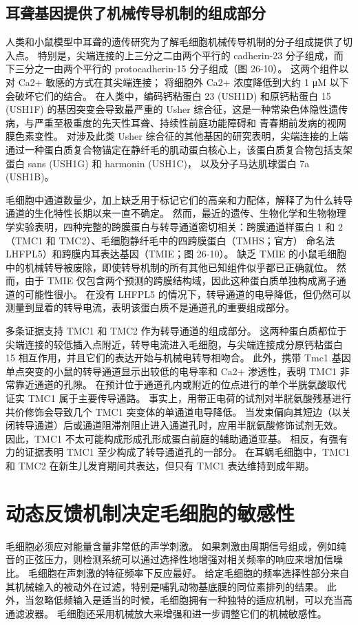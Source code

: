 \subsection{耳聋基因提供了机械传导机制的组成部分}
人类和小鼠模型中耳聋的遗传研究为了解毛细胞机械传导机制的分子组成提供了切入点。 
特别是，尖端连接的上三分之二由两个平行的 cadherin-23 分子组成，而下三分之一由两个平行的 protocadherin-15 分子组成（图 26-10）。 
这两个组件以对 Ca2+ 敏感的方式在其尖端连接； 将细胞外 Ca2+ 浓度降低到大约 1 μM 以下会破坏它们的结合。 
在人类中，编码钙粘蛋白 23 (USH1D) 和原钙粘蛋白 15 (USH1F) 的基因突变会导致最严重的 Usher 综合征，这是一种常染色体隐性遗传病，与严重至极重度的先天性耳聋、持续性前庭功能障碍和 青春期前发病的视网膜色素变性。 
对涉及此类 Usher 综合征的其他基因的研究表明，尖端连接的上端通过一种蛋白质复合物锚定在静纤毛的肌动蛋白核心上，该蛋白质复合物包括支架蛋白 sans (USH1G) 和 harmonin (USH1C)， 以及分子马达肌球蛋白 7a (USH1B)。


毛细胞中通道数量少，加上缺乏用于标记它们的高亲和力配体，解释了为什么转导通道的生化特性长期以来一直不确定。 
然而，最近的遗传、生物化学和生物物理学实验表明，四种完整的跨膜蛋白与转导通道密切相关：跨膜通道样蛋白 1 和 2（TMC1 和 TMC2）、毛细胞静纤毛中的四跨膜蛋白（TMHS；官方） 命名法 LHFPL5）和跨膜内耳表达基因（TMIE；图 26-10）。 
缺乏 TMIE 的小鼠毛细胞中的机械转导被废除，即使转导机制的所有其他已知组件似乎都已正确就位。 
然而，由于 TMIE 仅包含两个预测的跨膜结构域，因此这种蛋白质单独构成离子通道的可能性很小。 
在没有 LHFPL5 的情况下，转导通道的电导降低，但仍然可以测量到显着的转导电流，表明该蛋白质不是通道孔的重要组成部分。


多条证据支持 TMC1 和 TMC2 作为转导通道的组成部分。 
这两种蛋白质都位于尖端连接的较低插入点附近，转导电流进入毛细胞，与尖端连接成分原钙粘蛋白 15 相互作用，并且它们的表达开始与机械电转导相吻合。 
此外，携带 Tmc1 基因单点突变的小鼠的转导通道显示出较低的电导率和 Ca2+ 渗透性，表明 TMC1 非常靠近通道的孔隙。 
在预计位于通道孔内或附近的位点进行的单个半胱氨酸取代证实 TMC1 属于主要传导通路。 
事实上，用带正电荷的试剂对半胱氨酸残基进行共价修饰会导致几个 TMC1 突变体的单通道电导降低。 
当发束偏向其短边（以关闭转导通道）后或通道阻滞剂阻止进入通道孔时，应用半胱氨酸修饰试剂无效。 
因此，TMC1 不太可能构成形成孔形成蛋白前庭的辅助通道亚基。 
相反，有强有力的证据表明 TMC1 至少构成了转导通道孔的一部分。 
在耳蜗毛细胞中，TMC1 和 TMC2 在新生儿发育期间共表达，但只有 TMC1 表达维持到成年期。


\section{动态反馈机制决定毛细胞的敏感性}
毛细胞必须应对能量含量非常低的声学刺激。 如果刺激由周期信号组成，例如纯音的正弦压力，则检测系统可以通过选择性地增强对相关频率的响应来增加信噪比。 毛细胞在声刺激的特征频率下反应最好。 给定毛细胞的频率选择性部分来自其机械输入的被动外在过滤，特别是哺乳动物基底膜的同位素排列的结果。 此外，当忽略低频输入是适当的时候，毛细胞拥有一种独特的适应机制，可以充当高通滤波器。 毛细胞还采用机械放大来增强和进一步调整它们的机械敏感性。

